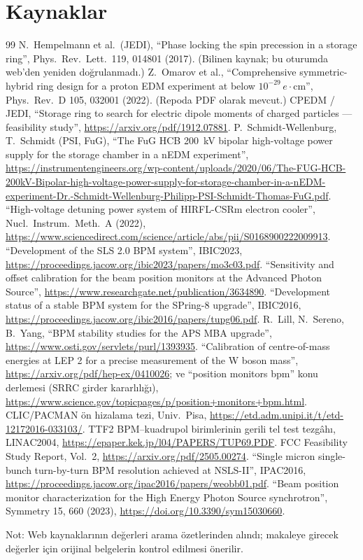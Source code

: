 \documentclass[11pt,a4paper]{article}
\begin{document}
\section*{Kaynaklar}
\begin{thebibliography}{99}\small
{} N.~Hempelmann et al.\ (JEDI), ``Phase locking the spin precession in a storage
ring'', Phys.\ Rev.\ Lett.\ 119, 014801 (2017). (Bilinen kaynak; bu oturumda web'den yeniden doğrulanmadı.)
 Z.~Omarov et al., ``Comprehensive symmetric-hybrid ring design for a proton EDM experiment
at below $10^{-29}\,e\cdot$cm'', Phys.\ Rev.\ D 105, 032001 (2022). (Repoda PDF olarak mevcut.)
 CPEDM / JEDI, ``Storage ring to search for electric dipole moments of charged particles
--- feasibility study'', \url{https://arxiv.org/pdf/1912.07881}.
 P.~Schmidt-Wellenburg, T.~Schmidt (PSI, FuG), ``The FuG HCB 200~kV bipolar high-voltage power
supply for the storage chamber in a nEDM experiment'',
\url{https://instrumentengineers.org/wp-content/uploads/2020/06/The-FUG-HCB-200kV-Bipolar-high-voltage-power-supply-for-storage-chamber-in-a-nEDM-experiment-Dr.-Schmidt-Wellenburg-Philipp-PSI-Schmidt-Thomas-FuG.pdf}.
 ``High-voltage detuning power system of HIRFL-CSRm electron cooler'', Nucl.\ Instrum.\
Meth.\ A (2022), \url{https://www.sciencedirect.com/science/article/abs/pii/S0168900222009913}.
\bibitem{sls2} ``Development of the SLS 2.0 BPM system'', IBIC2023, \url{https://proceedings.jacow.org/ibic2023/papers/mo3c03.pdf}.
\bibitem{aps_drift} ``Sensitivity and offset calibration for the beam position monitors at the Advanced
Photon Source'', \url{https://www.researchgate.net/publication/3634890}.
\bibitem{spring8} ``Development status of a stable BPM system for the SPring-8 upgrade'', IBIC2016,
\url{https://proceedings.jacow.org/ibic2016/papers/tupg06.pdf}.
 R.~Lill, N.~Sereno, B.~Yang, ``BPM stability studies for the APS MBA upgrade'',
\url{https://www.osti.gov/servlets/purl/1393935}.
 ``Calibration of centre-of-mass energies at LEP 2 for a precise measurement of the W boson
mass'', \url{https://arxiv.org/pdf/hep-ex/0410026}; ve ``position monitors bpm'' konu derlemesi (SRRC
girder kararlılığı), \url{https://www.science.gov/topicpages/p/position+monitors+bpm.html}.
\bibitem{pacman} CLIC/PACMAN ön hizalama tezi, Univ.\ Pisa, \url{https://etd.adm.unipi.it/t/etd-12172016-033103/}.
\bibitem{ttf2} TTF2 BPM--kuadrupol birimlerinin gerili tel test tezgâhı, LINAC2004,
\url{https://epaper.kek.jp/l04/PAPERS/TUP69.PDF}.
 FCC Feasibility Study Report, Vol.~2, \url{https://arxiv.org/pdf/2505.00274}.
\bibitem{nsls2} ``Single micron single-bunch turn-by-turn BPM resolution achieved at NSLS-II'', IPAC2016,
\url{https://proceedings.jacow.org/ipac2016/papers/weobb01.pdf}.
\bibitem{heps} ``Beam position monitor characterization for the High Energy Photon Source synchrotron'',
Symmetry 15, 660 (2023), \url{https://doi.org/10.3390/sym15030660}.
\end{thebibliography}
Not: Web kaynaklarının değerleri arama özetlerinden alındı; makaleye girecek değerler için orijinal
belgelerin kontrol edilmesi önerilir.
\end{document}
